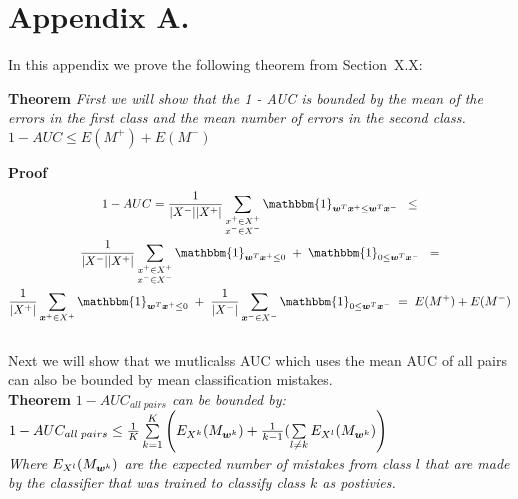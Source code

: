 
\section*{Appendix A.}
\label{app:theorem}



In this appendix we prove the following theorem from
Section~X.X:

\noindent

{\bf Theorem} {\it First we will show that the 1 - AUC is bounded by the mean 
of the errors in the first class and the mean number of errors in the second
class.  $1 - AUC \leq E(M^+) + E(M^-)$ 
}

{\bf Proof} 
\begin{multline}
1 - AUC = \frac{1}{|X^-| |X^+|} \sum\limits_{ \substack{x^+ \in X^+ \\ x^- \in X^-}} {  \mathbbm{1}_{\vw^T \vx^+ \leq \vw^T \vx^-} } \;\;\leq \\
\frac{1}{|X^-| |X^+|}  \sum\limits_{ \substack{x^+ \in X^+ \\ x^- \in X^-}} {  \mathbbm{1}_{\vw^T \vxp \leq 0} \;+\; \mathbbm{1}_{0 \leq \vw^T \vxn}  }  \;\;= \\
\frac{1}{|X^+|}  \sum\limits_{\vxp \in X^+}{  \mathbbm{1}_{\vw^T \vxp \leq 0} } \;+\; \frac{1}{|X^-|}  \sum\limits_{\vxn \in X^-}{\mathbbm{1}_{0 \leq \vw^T \vxn }  }   \;= \;
E(M^+) + E(M^-)
\end{multline}
\hfill\BlackBox \\


Next we will show that we mutlicalss AUC which uses the mean AUC of all pairs can also be bounded by mean classification mistakes.\\

{\bf Theorem} {\it $1 - AUC_{all \; pairs}$ can be bounded by: \\
 $1 - AUC_{all \; pairs} \leq \frac{1}{K}  \sum\limits_{k=1}^{K}  \left( E_{X^k}(M_{\bm{w}^k}) + \frac{1}{k-1} ( \sum\limits_{l \neq k}  E_{X^l}(M_{\bm{w}^k})  \right) $ 
\\ Where $E_{X^l}(M_{\bm{w}^k})$ are the expected number of mistakes from class $l$ that are made by the classifier that was trained to classify class $k$ as postivies.}
\\


